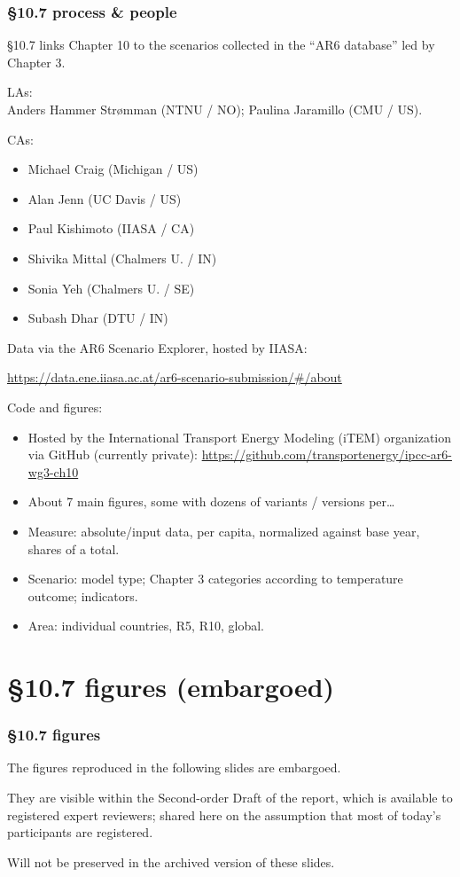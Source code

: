 \documentclass[12pt,aspectratio=169]{beamer}
\begin{document}
\begin{frame}[allowframebreaks]
\frametitle{§10.7 process \& people}

§10.7 links Chapter 10 to the scenarios collected in the “AR6 database” led by Chapter 3.

\smallskip
LAs:\\ Anders Hammer Strømman (NTNU / NO); Paulina Jaramillo (CMU / US).

\smallskip
CAs:
\begin{itemize}
  \item Michael Craig (Michigan / US)
  \item Alan Jenn (UC Davis / US)
  \item Paul Kishimoto (IIASA / CA)
  \item Shivika Mittal (Chalmers U. / IN)
  \item Sonia Yeh (Chalmers U. / SE)
  \item Subash Dhar (DTU / IN)
\end{itemize}

\framebreak
Data via the AR6 Scenario Explorer, hosted by IIASA:

\url{https://data.ene.iiasa.ac.at/ar6-scenario-submission/\#/about}

\bigskip

Code and figures:

\begin{itemize}
  \item Hosted by the International Transport Energy Modeling (iTEM) organization via GitHub (currently private):
  \url{https://github.com/transportenergy/ipcc-ar6-wg3-ch10}
  \item About 7 main figures, some with dozens of variants / versions per…
  \item Measure: absolute/input data, per capita, normalized against base year, shares of a total.
  \item Scenario: model type; Chapter 3 categories according to temperature outcome; indicators.
  \item Area: individual countries, R5, R10, global.
\end{itemize}

\end{frame}

\section{§10.7 figures (embargoed)}

\begin{frame}
\frametitle{§10.7 figures}

The figures reproduced in the following slides are \alert{embargoed}.

\medskip
They are visible within the Second-order Draft of the report, which is available to registered expert reviewers; shared here on the assumption that most of today's participants are registered.

\medskip
Will not be preserved in the archived version of these slides.

\end{frame}
\end{document}
